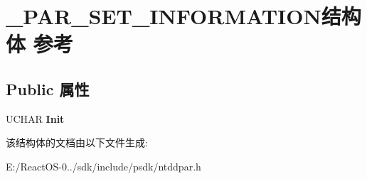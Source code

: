 \hypertarget{struct___p_a_r___s_e_t___i_n_f_o_r_m_a_t_i_o_n}{}\section{\+\_\+\+P\+A\+R\+\_\+\+S\+E\+T\+\_\+\+I\+N\+F\+O\+R\+M\+A\+T\+I\+O\+N结构体 参考}
\label{struct___p_a_r___s_e_t___i_n_f_o_r_m_a_t_i_o_n}
\subsection*{Public 属性}
\begin{DoxyCompactItemize}
\item 
\mbox{\label{struct___p_a_r___s_e_t___i_n_f_o_r_m_a_t_i_o_n_adeff65606b7dea07bbbc7d7d6424c55d}} 
U\+C\+H\+AR {\bfseries Init}
\end{DoxyCompactItemize}


该结构体的文档由以下文件生成\+:\begin{DoxyCompactItemize}
\item 
E\+:/\+React\+O\+S-\/0../sdk/include/psdk/ntddpar.\+h\end{DoxyCompactItemize}
